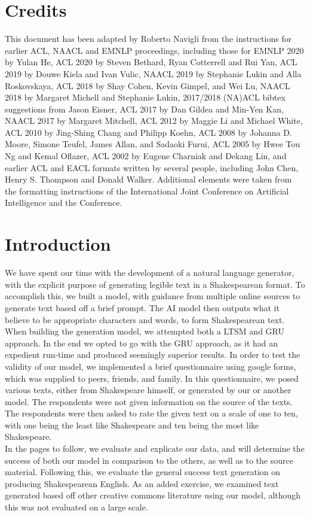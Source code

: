 \documentclass[11pt,a4paper]{article}
\begin{document}
\section{Credits}
This document has been adapted by Roberto Navigli from the instructions for earlier ACL, NAACL and EMNLP proceedings, including those for EMNLP 2020 by Yulan He, ACL 2020 by Steven Bethard, Ryan Cotterrell and Rui Yan, ACL 2019 by Douwe Kiela and Ivan Vulic, NAACL 2019 by Stephanie Lukin and Alla Roskovskaya, ACL 2018 by Shay Cohen, Kevin Gimpel, and Wei Lu, NAACL 2018 by Margaret Michell and Stephanie Lukin, 2017/2018 (NA)ACL bibtex suggestions from Jason Eisner, ACL 2017 by Dan Gildea and
Min-Yen Kan, NAACL 2017 by Margaret Mitchell, ACL 2012 by Maggie Li and Michael White, ACL 2010 by Jing-Shing Chang and Philipp Koehn, ACL 2008 by Johanna D. Moore, Simone Teufel, James Allan, and Sadaoki Furui, ACL 2005 by Hwee Tou Ng and Kemal Oflazer, ACL 2002 by Eugene Charniak and Dekang Lin, and earlier ACL and EACL formats written by several people, including John Chen, Henry S. Thompson and Donald Walker. Additional elements were taken from the formatting instructions of the International
Joint Conference on Artificial Intelligence and the Conference. 

\section{Introduction}
\label{sec:intro}
We have spent our time with the development of a natural language generator, with the explicit purpose of generating legible text in a Shakespearean format. To accomplish this, we built a model, with guidance from multiple online sources to generate text based off a brief prompt. The AI model then outputs what it believe to be appropriate characters and words, to form Shakespearean text. When building the generation model, we attempted both a LTSM and GRU approach. In the end we opted to go with the GRU approach, as it had an expedient run-time and produced seemingly superior results. In order to test the validity of our model, we implemented a brief questionnaire using google forms, which was supplied to peers, friends, and family. In this questionnaire, we posed various texts, either from Shakespeare himself, or generated by our or another model. The respondents were not given information on the source of the texts. The respondents were then asked to rate the given text on a scale of one to ten, with one being the least like Shakespeare and ten being the most like Shakespeare. \\
In the pages to follow, we evaluate and explicate our data, and will determine the success of both our model in comparison to the others, as well as to the source material. Following this, we evaluate the general success text generation on producing Shakespearean English. As an added exercise, we examined text generated based off other creative commons literature using our model, although this was not evaluated on a large scale.
\end{document}
